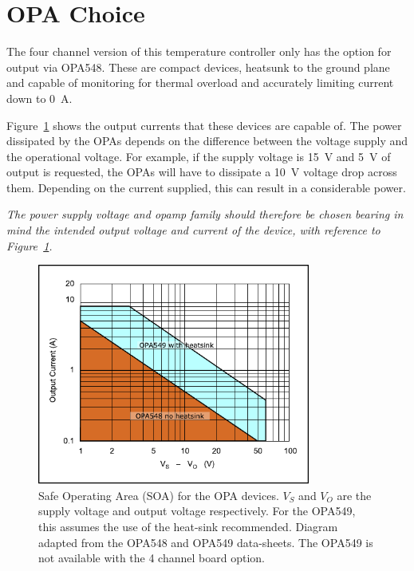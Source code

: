 \documentclass[11pt]{report}
\begin{document}


\section{OPA Choice} %
\label{sub:opa_choice}

The four channel version of this temperature controller only has the option for output via OPA548. These are compact devices, heatsunk to the ground plane and capable of monitoring for thermal overload and accurately limiting current down to \SI{0}{A}. 

Figure~\ref{fig:OPA_SOA} shows the output currents that these devices are capable of. The power dissipated by the OPAs depends on the difference between the voltage supply and the operational voltage. For example, if the supply voltage is \SI{15}{\volt} and \SI{5}{\volt} of output is requested, the OPAs will have to dissipate a \SI{10}{\volt} voltage drop across them. Depending on the current supplied, this can result in a considerable power.

\textit{The power supply voltage and opamp family should therefore be chosen bearing in mind the intended output voltage and current of the device, with reference to Figure~\ref{fig:OPA_SOA}. }

\begin{figure}[tb]
	\centering
	\includegraphics[width=0.8\textwidth]{OPA_SOAs/OPA_SOA}
	\caption{Safe Operating Area (SOA) for the OPA devices. $V_S$ and $V_O$ are the supply voltage and output voltage respectively. For the OPA549, this assumes the use of the heat-sink recommended. Diagram adapted from the OPA548 and OPA549 data-sheets. The OPA549 is not available with the 4 channel board option. }
	\label{fig:OPA_SOA}
\end{figure}
\end{document}
